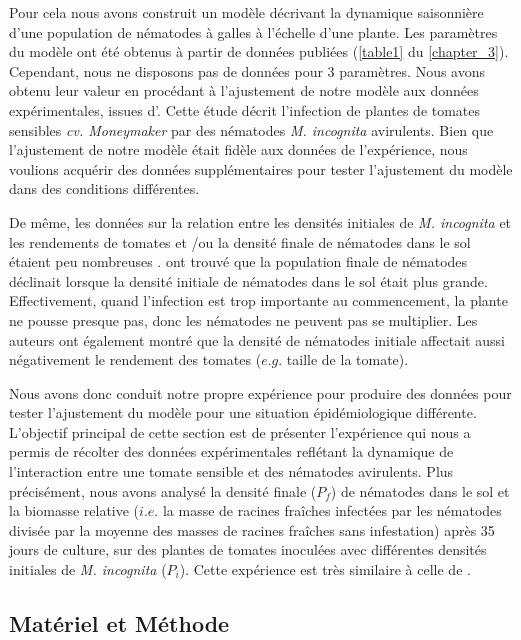 	Pour cela nous avons construit un modèle décrivant la dynamique saisonnière d'une
population de nématodes à galles à l'échelle d'une plante.  Les paramètres du modèle ont été obtenus à partir de données publiées (\autoref{table1} du \autoref{chapter_3}). %
Cependant, nous ne disposons pas de données pour 3 paramètres.
Nous avons obtenu leur valeur en procédant à l’ajustement de notre modèle aux données expérimentales, issues d’\citet{Ehwaeti1998}. Cette étude décrit l’infection de plantes de tomates sensibles \textit{cv. Moneymaker}   par des nématodes \textit{M. incognita}
	avirulents. Bien que l'ajustement de notre modèle était fidèle aux données de l'expérience, nous voulions acquérir des données supplémentaires pour tester  l'ajustement du modèle dans des conditions différentes.
	
	De même, les données sur la relation entre les densités initiales de \textit{M.
incognita} et les rendements de tomates  et /ou la densité finale de nématodes dans le sol étaient peu nombreuses \citep{Wesemael2011, Greco2010}. 
\citet{Vito1991} ont trouvé que la population finale de nématodes déclinait lorsque la densité initiale de nématodes dans le sol était plus grande.
Effectivement, quand l'infection est trop importante au commencement, la plante ne pousse presque pas, donc les nématodes ne peuvent pas se multiplier.
Les auteurs ont également montré que la densité de nématodes initiale affectait aussi négativement  le rendement des tomates ($e.g.$ taille de la tomate).
	
	Nous avons donc  conduit notre propre expérience pour produire des données pour  tester l'ajustement du modèle pour une situation épidémiologique différente.
L'objectif principal de cette section est de présenter l'expérience qui nous a permis de récolter des données expérimentales reflétant la dynamique de l'interaction entre une tomate sensible  et des nématodes avirulents.
	Plus précisément, nous avons analysé la densité finale ($P_f$)  de nématodes dans le sol et la biomasse relative ($i.e.$ la masse de racines fraîches infectées par   les nématodes divisée par la moyenne des masses de racines fraîches sans infestation) après 35 jours de culture, sur des plantes de tomates inoculées avec différentes densités initiales de \textit{M. incognita} ($P_i$).  Cette expérience est très similaire à celle de \citep{Ehwaeti1998}. 
	
\subsection{Matériel et Méthode} 
	
